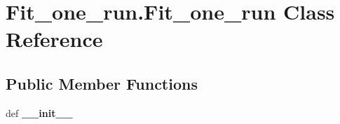 \hypertarget{classFit__one__run_1_1Fit__one__run}{\section{\-Fit\-\_\-one\-\_\-run.\-Fit\-\_\-one\-\_\-run \-Class \-Reference}
\label{classFit__one__run_1_1Fit__one__run}
}
\subsection*{\-Public \-Member \-Functions}
\begin{DoxyCompactItemize}
\item 
\hypertarget{classFit__one__run_1_1Fit__one__run_a026307f8059de3eaed0e0f30c213688e}{def {\bfseries \-\_\-\-\_\-init\-\_\-\-\_\-}}\label{classFit__one__run_1_1Fit__one__run_a026307f8059de3eaed0e0f30c213688e}


\end{DoxyCompactItemize}
